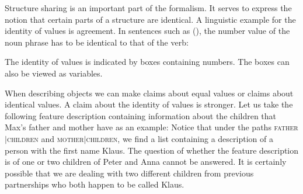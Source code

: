 Structure sharing is an important part of the formalism. It serves to express the notion that certain parts of a structure are identical. A linguistic
example for the identity of values is agreement. In sentences such as (), the number value of the noun phrase has to be identical to that of the verb:

\eal
{}
\zl
The identity of values is indicated by boxes containing numbers. The boxes can also be viewed as
variables.

When describing objects we can make claims about equal values or claims about identical values.
A claim about the identity of values is stronger. Let us take the following feature description containing
information about the children that Max's father and mother have as an example:
\ea
{}
\z
Notice that under the paths \textsc{father$|$children} and \textsc{mother$|$children}, we find a
list containing a description of a person with the first name Klaus. The question of whether the
feature description is of one or two children of Peter and Anna cannot be answered. It is certainly
possible that we are dealing with two different children from previous partnerships who both happen to be called
Klaus.


